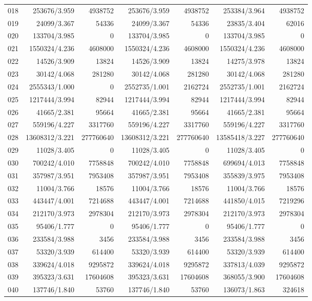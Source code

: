 \begin{longtable}{crrrrrr}
018 & 253676/3.959 & 4938752 & 253676/3.959 & 4938752 & 253384/3.964 & 4938752 \\
019 & 24099/3.367 & 54336 & 24099/3.367 & 54336 & 23835/3.404 & 62016 \\
020 & 133704/3.985 & 0 & 133704/3.985 & 0 & 133704/3.985 & 0 \\
021 & 1550324/4.236 & 4608000 & 1550324/4.236 & 4608000 & 1550324/4.236 & 4608000 \\
022 & 14526/3.909 & 13824 & 14526/3.909 & 13824 & 14275/3.978 & 13824 \\
023 & 30142/4.068 & 281280 & 30142/4.068 & 281280 & 30142/4.068 & 281280 \\
024 & 2555343/1.000 & 0 & 2552735/1.001 & 2162724 & 2552735/1.001 & 2162724 \\
025 & 1217444/3.994 & 82944 & 1217444/3.994 & 82944 & 1217444/3.994 & 82944 \\
026 & 41665/2.381 & 95664 & 41665/2.381 & 95664 & 41665/2.381 & 95664 \\
027 & 559196/4.227 & 3317760 & 559196/4.227 & 3317760 & 559196/4.227 & 3317760 \\
028 & 13608312/3.221 & 277760640 & 13608312/3.221 & 277760640 & 13585418/3.227 & 277760640 \\
029 & 11028/3.405 & 0 & 11028/3.405 & 0 & 11028/3.405 & 0 \\
030 & 700242/4.010 & 7758848 & 700242/4.010 & 7758848 & 699694/4.013 & 7758848 \\
031 & 357987/3.951 & 7953408 & 357987/3.951 & 7953408 & 355839/3.975 & 7953408 \\
032 & 11004/3.766 & 18576 & 11004/3.766 & 18576 & 11004/3.766 & 18576 \\
033 & 443447/4.001 & 7214688 & 443447/4.001 & 7214688 & 441850/4.015 & 7219296 \\
034 & 212170/3.973 & 2978304 & 212170/3.973 & 2978304 & 212170/3.973 & 2978304 \\
035 & 95406/1.777 & 0 & 95406/1.777 & 0 & 95406/1.777 & 0 \\
036 & 233584/3.988 & 3456 & 233584/3.988 & 3456 & 233584/3.988 & 3456 \\
037 & 53320/3.939 & 614400 & 53320/3.939 & 614400 & 53320/3.939 & 614400 \\
038 & 339624/4.018 & 9295872 & 339624/4.018 & 9295872 & 337813/4.039 & 9295872 \\
039 & 395323/3.631 & 17604608 & 395323/3.631 & 17604608 & 368055/3.900 & 17604608 \\
040 & 137746/1.840 & 53760 & 137746/1.840 & 53760 & 136073/1.863 & 324618 \\

\end{longtable}
